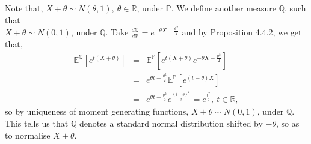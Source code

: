 \documentclass{article}
\begin{document}
Note that, $X + \theta \sim N(\theta,1), \ \theta\in\mathbb{R}$, under $\mathbb{P}$. We define another measure $\mathbb{Q}$, such that\\ $X + \theta \sim N(0,1)$, under $\mathbb{Q}$. Take $\frac{d\mathbb{Q}}{d\mathbb{P}} = e^{-\theta X - \frac{\theta^2}{2}}$ and by Proposition 4.4.2, we get that,
\begin{eqnarray}
\nonumber
\mathbb{E}^{\mathbb{Q}}[e^{t(X+\theta)}] &=& \mathbb{E}^{\mathbb{P}}[e^{t(X+\theta)}e^{-\theta X - \frac{\theta^2}{2}}]\\
\nonumber
&=& e^{\theta t - \frac{\theta^2}{2}} \mathbb{E}^{\mathbb{P}}[e^{(t-\theta)X}]\\
\nonumber
&=& e^{\theta t - \frac{\theta^2}{2}} e^{\frac{(t-\theta)^2}{2}} = e^{\frac{t^2}{2}}, \ t \in \mathbb{R},
\end{eqnarray}
so by uniqueness of moment generating functions, $X + \theta \sim N(0,1)$, under $\mathbb{Q}$. This tells us that $\mathbb{Q}$ denotes a standard normal distribution shifted by $-\theta$, so as to normalise $X + \theta$.
\end{document}
